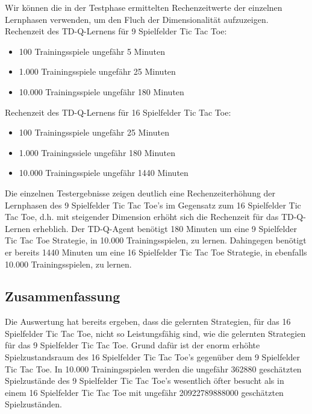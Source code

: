 Wir können die in der Testphase ermittelten Rechenzeitwerte der einzelnen Lernphasen verwenden, um den Fluch der Dimensionalität aufzuzeigen. \\

Rechenzeit des TD-Q-Lernens für 9 Spielfelder Tic Tac Toe: 
\begin{itemize}
\item 100 Trainingsspiele ungefähr 5 Minuten 
\item 1.000 Trainingsspiele ungefähr 25 Minuten
\item 10.000 Trainingsspiele ungefähr 180 Minuten
\end{itemize}

Rechenzeit des TD-Q-Lernens für 16 Spielfelder Tic Tac Toe: 
\begin{itemize}
\item 100 Trainingsspiele ungefähr 25 Minuten
\item 1.000 Trainingssiele ungefähr 180 Minuten
\item 10.000 Trainingsspiele ungefähr 1440 Minuten
\end{itemize}

Die einzelnen Testergebnisse zeigen deutlich eine Rechenzeiterhöhung der Lernphasen des 9 Spielfelder Tic Tac Toe's im Gegensatz zum 16 Spielfelder Tic Tac Toe, d.h. mit steigender Dimension erhöht sich die Rechenzeit für das TD-Q-Lernen erheblich. Der TD-Q-Agent benötigt 180 Minuten um eine 9 Spielfelder Tic Tac Toe Strategie, in 10.000 Trainingsspielen, zu lernen. Dahingegen benötigt er bereits 1440 Minuten um eine 16 Spielfelder Tic Tac Toe Strategie, in ebenfalls 10.000 Trainingsspielen, zu lernen. \\

\subsection{Zusammenfassung}
Die Auswertung hat bereits ergeben, dass die gelernten Strategien, für das 16 Spielfelder Tic Tac Toe, nicht so Leistungsfähig sind, wie die gelernten Strategien für das 9 Spielfelder Tic Tac Toe. Grund dafür ist der enorm erhöhte Spielzustandsraum des 16 Spielfelder Tic Tac Toe's gegenüber dem 9 Spielfelder Tic Tac Toe. In 10.000 Trainingsspielen werden die ungefähr 362880 geschätzten Spielzustände des 9 Spielfelder Tic Tac Toe's wesentlich öfter besucht als in einem 16 Spielfelder Tic Tac Toe mit ungefähr 20922789888000 geschätzten Spielzuständen. \\

